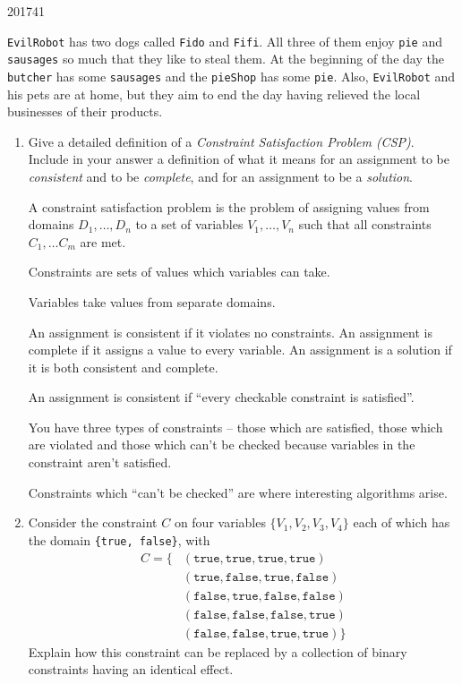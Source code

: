 \documentclass[10pt,\jkfside,a4paper]{article}
\begin{document}
\begin{examquestion}{2017}{4}{1}

\texttt{EvilRobot} has two dogs called \texttt{Fido} and \texttt{Fifi}. All
three of them enjoy \texttt{pie} and \texttt{sausages} so much that they
like to steal them. At the beginning of the day the \texttt{butcher} has some
\texttt{sausages} and the \texttt{pieShop} has some \texttt{pie}. Also,
\texttt{EvilRobot} and his pets are at home, but they aim to end the day
having relieved the local businesses of their products.

\begin{enumerate}[label=(\alph*)]

\item Give a detailed definition of a \textit{Constraint Satisfaction
Problem (CSP)}. Include in your answer a definition of what it means for an
assignment to be \textit{consistent} and to be \textit{complete}, and for an
assignment to be a \textit{solution}.

A constraint satisfaction problem is the problem of assigning values from
domains $D_1, \dots, D_n$ to a set of variables $V_1, \dots, V_n$ such that all
constraints $C_1, \dots C_m$ are met.

{\color{blue}
Constraints are sets of values which variables can take.

Variables take values from separate domains.
}

An assignment is consistent if it violates no constraints. An assignment is
complete if it assigns a value to every variable. An assignment is a
solution if it is both consistent and complete.

{\color{blue}
An assignment is consistent if ``every checkable constraint is satisfied''.

You have three types of constraints -- those which are satisfied, those
which are violated and those which can't be checked because variables in the
constraint aren't satisfied.

Constraints which ``can't be checked'' are where interesting algorithms arise.
}

\item Consider the constraint $C$ on four variables $\{V_1, V_2, V_3, V_4\}$
each of which has the domain \texttt{\{true, false\}}, with
\[
\begin{split}
C = \{
&(\texttt{true}, \texttt{true}, \texttt{true}, \texttt{true})\\
&(\texttt{true}, \texttt{false}, \texttt{true}, \texttt{false})\\
&(\texttt{false}, \texttt{true}, \texttt{false}, \texttt{false})\\
&(\texttt{false}, \texttt{false}, \texttt{false}, \texttt{true})\\
&(\texttt{false}, \texttt{false}, \texttt{true}, \texttt{true})\}
\end{split}
\]
Explain how this constraint can be replaced by a collection of binary
constraints having an identical effect.


\end{enumerate}
\end{examquestion}
\end{document}
